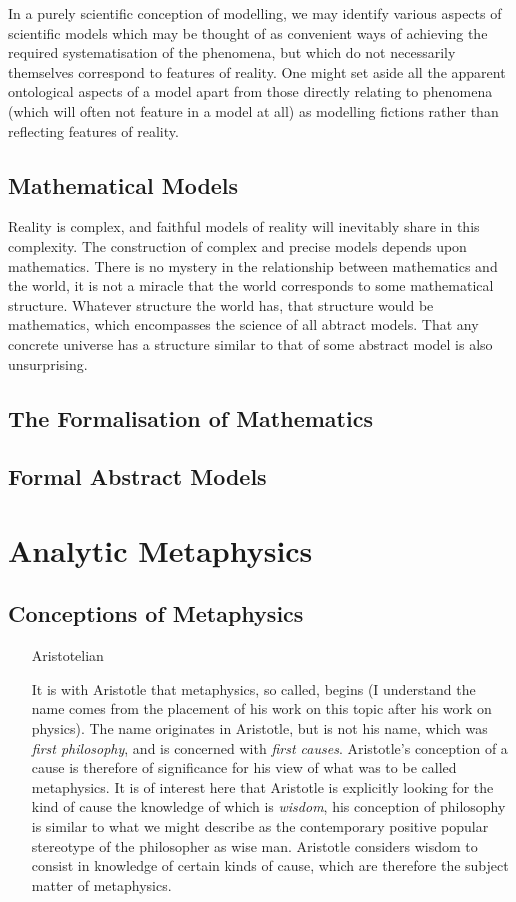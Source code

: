 \documentclass{rbjk}
\begin{document}
\begin{article}
In a purely scientific conception of modelling, we may identify various aspects of scientific models which may be thought of as convenient ways of achieving the required systematisation of the phenomena, but which do not necessarily themselves correspond to features of reality.
One might set aside all the apparent ontological aspects of a model apart from those directly relating to phenomena (which will often not feature in a model at all) as modelling fictions rather than reflecting features of reality.

\subsection{Mathematical Models}

Reality is complex, and faithful models of reality will inevitably share in this complexity.
The construction of complex and precise models depends upon mathematics.
There is no mystery in the relationship between mathematics and the world, it is not a miracle that the world corresponds to some mathematical structure.
Whatever structure the world has, that structure would be mathematics, which encompasses the science of all abtract models. 
That any concrete universe has a structure similar to that of some abstract model is also unsurprising.

\subsection{The Formalisation of Mathematics}

\subsection{Formal Abstract Models}

\section{Analytic Metaphysics}

\subsection{Conceptions of Metaphysics}

\begin{itemize}
\item[Aristotelian]

It is with Aristotle that metaphysics, so called, begins (I understand the name comes from the placement of his work on this topic after his work on physics).
The name originates in Aristotle, but is not his name, which was {\it first philosophy}, and is concerned with {\it first causes}.
Aristotle's conception of a cause is therefore of significance for his view of what was to be called metaphysics.
It is of interest here that Aristotle is explicitly looking for the kind of cause the knowledge of which is {\it wisdom}, his conception of philosophy is similar to what we might describe as the contemporary positive popular stereotype of the philosopher as wise man.
Aristotle considers wisdom to consist in knowledge of certain kinds of cause, which are therefore the subject matter of metaphysics.


\end{itemize}
\end{article}
\end{document}
